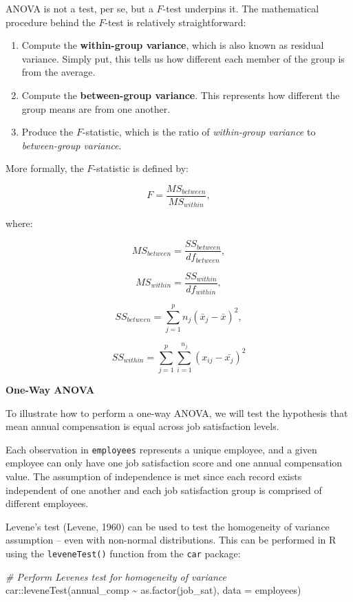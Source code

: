 \documentclass[
]{book}
\newenvironment{Shaded}{\begin{snugshade}}{\end{snugshade}}
\newcommand{\AttributeTok}[1]{\textcolor[rgb]{0.77,0.63,0.00}{#1}}
\newcommand{\CommentTok}[1]{\textcolor[rgb]{0.56,0.35,0.01}{\textit{#1}}}
\newcommand{\FunctionTok}[1]{\textcolor[rgb]{0.00,0.00,0.00}{#1}}
\newcommand{\NormalTok}[1]{#1}
\newcommand{\SpecialCharTok}[1]{\textcolor[rgb]{0.00,0.00,0.00}{#1}}
\providecommand{\tightlist}{%
  \setlength{\itemsep}{0pt}\setlength{\parskip}{0pt}}
\begin{document}
ANOVA is not a test, per se, but a \(F\)-test underpins it. The mathematical procedure behind the \(F\)-test is relatively straightforward:

\begin{enumerate}
\def\labelenumi{\arabic{enumi}.}
\tightlist
\item
  Compute the \textbf{within-group variance}, which is also known as residual variance. Simply put, this tells us how different each member of the group is from the average.
\item
  Compute the \textbf{between-group variance}. This represents how different the group means are from one another.
\item
  Produce the \(F\)-statistic, which is the ratio of \emph{within-group variance} to \emph{between-group variance}.
\end{enumerate}

More formally, the \(F\)-statistic is defined by:

\[ F = \frac{MS_{between}}{MS_{within}}, \]

where:

\[ MS_{between} = \frac{SS_{between}}{df_{between}}, \]

\[ MS_{within} = \frac{SS_{within}}{df_{within}}, \]

\[ SS_{between} = \displaystyle\sum_{j=1}^{p} n_j(\bar{x}_j-\bar{x})^2, \]

\[ SS_{within} = \displaystyle\sum_{j=1}^{p} \displaystyle\sum_{i=1}^{n_j} (x_{ij}-\bar{x_j})^2 \]

\textbf{One-Way ANOVA}

To illustrate how to perform a one-way ANOVA, we will test the hypothesis that mean annual compensation is equal across job satisfaction levels.

Each observation in \texttt{employees} represents a unique employee, and a given employee can only have one job satisfaction score and one annual compensation value. The assumption of independence is met since each record exists independent of one another and each job satisfaction group is comprised of different employees.

Levene's test (Levene, 1960) can be used to test the homogeneity of variance assumption -- even with non-normal distributions. This can be performed in R using the \texttt{leveneTest()} function from the \texttt{car} package:

\begin{Shaded}
\begin{Highlighting}[]
\CommentTok{\# Perform Levene\textquotesingle{}s test for homogeneity of variance}
\NormalTok{car}\SpecialCharTok{::}\FunctionTok{leveneTest}\NormalTok{(annual\_comp }\SpecialCharTok{\textasciitilde{}} \FunctionTok{as.factor}\NormalTok{(job\_sat), }\AttributeTok{data =}\NormalTok{ employees)}
\end{Highlighting}
\end{Shaded}
\end{document}
